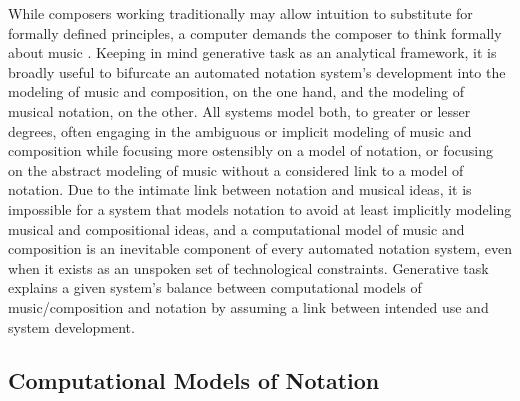 While composers working traditionally may allow intuition to substitute for formally defined principles, a computer demands the composer to think formally about music \cite{Xenakis:1992rq}. Keeping in mind generative task as an analytical framework, it is broadly useful to bifurcate an automated notation system's development into the modeling of music and composition, on the one hand, and the modeling of musical notation, on the other. All systems model both, to greater or lesser degrees, often engaging in the ambiguous or implicit modeling of music and composition while focusing more ostensibly on a model of notation, or focusing on the abstract modeling of music without a considered link to a model of notation. Due to the intimate link between notation and musical ideas, it is impossible for a system that models notation to avoid at least implicitly modeling musical and compositional ideas, and a computational model of music and composition is an inevitable component of every automated notation system, even when it exists as an unspoken set of technological constraints. Generative task explains a given system's balance between computational models of music/composition and notation by assuming a link between intended use and system development.

\subsection{Computational Models of Notation}

